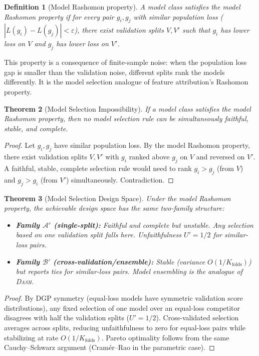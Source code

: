 \documentclass{article}
\newtheorem{theorem}{Theorem}
\newtheorem{definition}[theorem]{Definition}
\newcommand{\DASH}{\textsc{Dash}}
\begin{document}
\begin{definition}[Model Rashomon property]
A model class satisfies the \emph{model Rashomon property} if for every pair $g_i, g_j$ with similar population loss ($|L(g_i) - L(g_j)| < \varepsilon$), there exist validation splits $V, V'$ such that $g_i$ has lower loss on $V$ and $g_j$ has lower loss on $V'$.
\end{definition}

This property is a consequence of finite-sample noise: when the population loss gap is smaller than the validation noise, different splits rank the models differently. It is the model selection analogue of feature attribution's Rashomon property.

\begin{theorem}[Model Selection Impossibility]
\label{thm:model-selection}
If a model class satisfies the model Rashomon property, then no model selection rule can be simultaneously faithful, stable, and complete.
\end{theorem}

\begin{proof}
Let $g_i, g_j$ have similar population loss. By the model Rashomon property, there exist validation splits $V, V'$ with $g_i$ ranked above $g_j$ on $V$ and reversed on $V'$. A faithful, stable, complete selection rule would need to rank $g_i > g_j$ (from $V$) and $g_j > g_i$ (from $V'$) simultaneously. Contradiction.
\end{proof}

\begin{theorem}[Model Selection Design Space]
\label{thm:model-selection-ds}
Under the model Rashomon property, the achievable design space has the same two-family structure:
\begin{itemize}
    \item \textbf{Family $\mathcal{A}'$ (single-split):} Faithful and complete but unstable. Any selection based on one validation split falls here. Unfaithfulness $U' = 1/2$ for similar-loss pairs.
    \item \textbf{Family $\mathcal{B}'$ (cross-validation/ensemble):} Stable (variance $O(1/K_{\text{folds}})$) but reports ties for similar-loss pairs. Model ensembling is the analogue of \DASH{}.
\end{itemize}
\end{theorem}

\begin{proof}
By DGP symmetry (equal-loss models have symmetric validation score distributions), any fixed selection of one model over an equal-loss competitor disagrees with half the validation splits ($U' = 1/2$). Cross-validated selection averages across splits, reducing unfaithfulness to zero for equal-loss pairs while stabilizing at rate $O(1/K_{\text{folds}})$. Pareto optimality follows from the same Cauchy--Schwarz argument (Cram\'er--Rao in the parametric case).
\end{proof}
\end{document}
